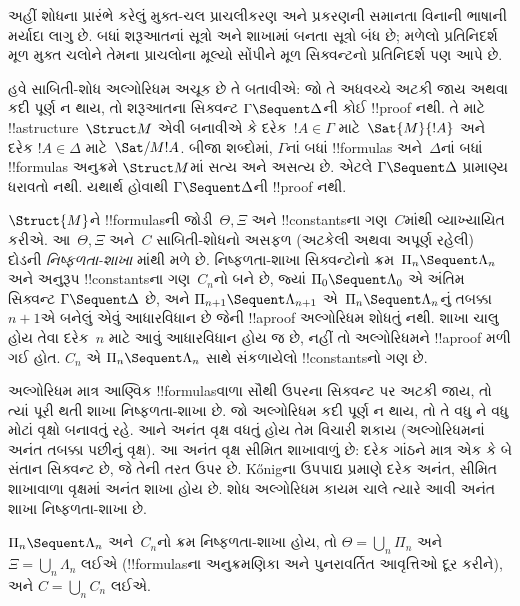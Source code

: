 \documentclass[../../../include/open-logic-section]{subfiles}
\begin{document}


અહીં શોધના પ્રારંભે કરેલું મુક્ત-ચલ પ્રાચલીકરણ
અને પ્રકરણની સમાનતા વિનાની ભાષાની મર્યાદા લાગુ છે.
બધાં શરૂઆતનાં સૂત્રો અને શાખામાં બનતા સૂત્રો બંધ છે;
મળેલો પ્રતિનિદર્શ મૂળ મુક્ત ચલોને તેમના પ્રાચલોના
મૂલ્યો સોંપીને મૂળ સિક્વન્ટનો પ્રતિનિદર્શ પણ આપે છે.


હવે સાબિતી-શોધ
અલ્ગોરિધમ અચૂક
છે તે બતાવીએ:
જો તે અધવચ્ચે
અટકી જાય અથવા
કદી પૂર્ણ ન
થાય, તો શરૂઆતના
સિક્વન્ટ
$\Gamma \Sequent \Delta$ની
કોઈ !!{proof}
નથી. તે માટે
!!a{structure}~$\Struct M$
એવી બનાવીએ કે
દરેક~$!A \in \Gamma$
માટે~$\Sat{M}{!A}$
અને દરેક
$!A \in \Delta$
માટે~$\Sat/{M}{!A}$.
બીજા શબ્દોમાં,
$\Gamma$નાં બધાં
!!{formula}s
અને~$\Delta$નાં
બધાં !!{formula}s
અનુક્રમે
$\Struct M$માં
સત્ય અને અસત્ય
છે. એટલે
$\Gamma \Sequent \Delta$
પ્રામાણ્ય ધરાવતો નથી.
 યથાર્થ
હોવાથી
$\Gamma \Sequent \Delta$ની
!!{proof} નથી.

$\Struct{M}$ને
!!{formula}sની
જોડી~$\Theta, \Xi$
અને
!!{constant}sના
ગણ~$C$માંથી
વ્યાખ્યાયિત કરીએ.
આ~$\Theta, \Xi$
અને~$C$
સાબિતી-શોધનો
અસફળ (અટકેલી
અથવા અપૂર્ણ
રહેલી) દોડની
\emph{નિષ્ફળતા-શાખા}
માંથી મળે છે.
નિષ્ફળતા-શાખા
સિક્વન્ટોનો
ક્રમ~$\Pi_n \Sequent
\Lambda_n$
અને અનુરૂપ
!!{constant}sના
ગણ~$C_n$નો
બને છે, જ્યાં
$\Pi_0 \Sequent \Lambda_0$
એ અંતિમ
સિક્વન્ટ
$\Gamma \Sequent
\Delta$ છે,
અને
$\Pi_{n+1} \Sequent \Lambda_{n+1}$
એ~$\Pi_n
\Sequent \Lambda_n$નું
તબક્કા~$n+1$એ
બનેલું એવું
આધારવિધાન છે
જેની !!a{proof}
અલ્ગોરિધમ શોધતું
નથી. શાખા
ચાલુ હોય તેવા
દરેક~$n$
માટે આવું
આધારવિધાન હોય
જ છે, નહીં તો
અલ્ગોરિધમને
!!a{proof}
મળી ગઈ હોત.
$C_n$ એ
$\Pi_n
\Sequent \Lambda_n$
સાથે સંકળાયેલો
!!{constant}sનો
ગણ છે.


અલ્ગોરિધમ માત્ર
આણ્વિક
!!{formula}sવાળા
સૌથી ઉપરના
સિક્વન્ટ પર
અટકી જાય,
તો ત્યાં પૂરી
થતી શાખા
નિષ્ફળતા-શાખા
છે. જો
અલ્ગોરિધમ
કદી પૂર્ણ ન
થાય, તો તે
વધુ ને વધુ
મોટાં વૃક્ષો
બનાવતું રહે.
આને અનંત
વૃક્ષ વધતું
હોય તેમ
વિચારી શકાય
(અલ્ગોરિધમનાં
અનંત તબક્કા
પછીનું વૃક્ષ).
આ અનંત વૃક્ષ
સીમિત શાખાવાળું
છે: દરેક ગાંઠને
માત્ર એક કે
બે સંતાન
સિક્વન્ટ છે,
જે તેની તરત
ઉપર છે.
K\H{o}nigના
ઉપપાદ્ય પ્રમાણે
દરેક અનંત,
સીમિત શાખાવાળા
વૃક્ષમાં અનંત
શાખા હોય છે.
શોધ અલ્ગોરિધમ
કાયમ ચાલે
ત્યારે આવી
અનંત શાખા
નિષ્ફળતા-શાખા
છે.

$\Pi_n \Sequent \Lambda_n$
અને~$C_n$નો
ક્રમ નિષ્ફળતા-શાખા
હોય, તો
$\Theta = \bigcup_n \Pi_n$
અને
$\Xi = \bigcup_n \Lambda_n$
લઈએ
(!!{formula}sના
અનુક્રમણિકા અને
પુનરાવર્તિત
આવૃત્તિઓ દૂર
કરીને), અને
$C =
\bigcup_n C_n$
લઈએ.
\end{document}
